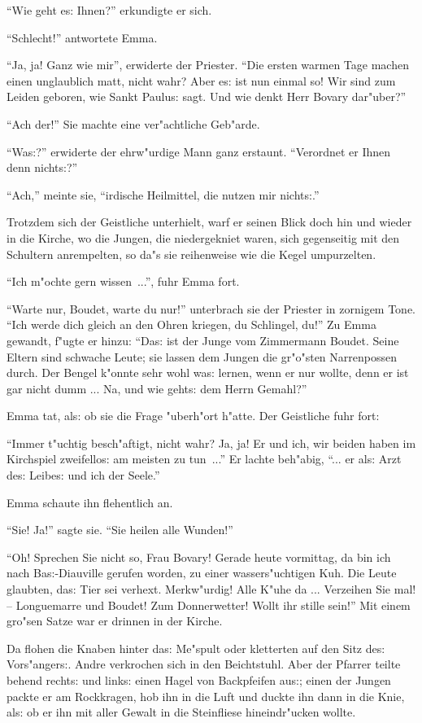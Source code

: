 \documentclass[oneside,12pt]{book}
\newcommand{\s}{s:}%
\begin{document}
"`Wie geht e{\s} Ihnen?"' erkundigte er sich.

"`Schlecht!"' antwortete Emma.

"`Ja, ja! Ganz wie mir"', erwiderte der Priester. "`Die ersten
warmen Tage machen einen unglaublich matt, nicht wahr? Aber e{\s}
ist nun einmal so! Wir sind zum Leiden geboren, wie Sankt
Paulu{\s} sagt. Und wie denkt Herr Bovary dar"uber?"'

"`Ach der!"' Sie machte eine ver"achtliche Geb"arde.

"`Wa{\s}?"' erwiderte der ehrw"urdige Mann ganz erstaunt.
"`Verordnet er Ihnen denn nicht{\s}?"'

"`Ach,"' meinte sie, "`irdische Heilmittel, die nutzen mir
nicht{\s}."'

Trotzdem sich der Geistliche unterhielt, warf er seinen Blick doch
hin und wieder in die Kirche, wo die Jungen, die niedergekniet
waren, sich gegenseitig mit den Schultern anrempelten, so da"s sie
reihenweise wie die Kegel umpurzelten.

"`Ich m"ochte gern wissen~..."', fuhr Emma fort.

"`Warte nur, Boudet, warte du nur!"' unterbrach sie der Priester
in zornigem Tone. "`Ich werde dich gleich an den Ohren kriegen, du
Schlingel, du!"' Zu Emma gewandt, f"ugte er hinzu: "`Da{\s} ist
der Junge vom Zimmermann Boudet. Seine Eltern sind schwache Leute;
sie lassen dem Jungen die gr"o"sten Narrenpossen durch. Der Bengel
k"onnte sehr wohl wa{\s} lernen, wenn er nur wollte, denn er ist
gar nicht dumm ... Na, und wie geht{\s} dem Herrn Gemahl?"'

Emma tat, al{\s} ob sie die Frage "uberh"ort h"atte. Der
Geistliche fuhr fort:

"`Immer t"uchtig besch"aftigt, nicht wahr? Ja, ja! Er und ich, wir
beiden haben im Kirchspiel zweifello{\s} am meisten zu tun~..."'
Er lachte beh"abig, "`... er al{\s} Arzt de{\s} Leibe{\s} und ich
der Seele."'

Emma schaute ihn flehentlich an.

"`Sie! Ja!"' sagte sie. "`Sie heilen alle Wunden!"'

"`Oh! Sprechen Sie nicht so, Frau Bovary! Gerade heute vormittag,
da bin ich nach Ba{\s}-Diauville gerufen worden, zu einer
wassers"uchtigen Kuh. Die Leute glaubten, da{\s} Tier sei verhext.
Merkw"urdig! Alle K"uhe da ... Verzeihen Sie mal! -- Longuemarre
und Boudet! Zum Donnerwetter! Wollt ihr stille sein!"' Mit einem
gro"sen Satze war er drinnen in der Kirche.

Da flohen die Knaben hinter da{\s} Me"spult oder kletterten auf
den Sitz de{\s} Vors"anger{\s}. Andre verkrochen sich in den
Beichtstuhl. Aber der Pfarrer teilte behend recht{\s} und link{\s}
einen Hagel von Backpfeifen au{\s}; einen der Jungen packte er am
Rockkragen, hob ihn in die Luft und duckte ihn dann in die Knie,
al{\s} ob er ihn mit aller Gewalt in die Steinfliese
hineindr"ucken wollte.
\end{document}
